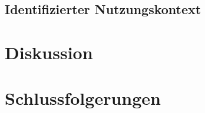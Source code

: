 \subsection{Identifizierter Nutzungskontext}


    

\section{Diskussion}



%
\section{Schlussfolgerungen}


